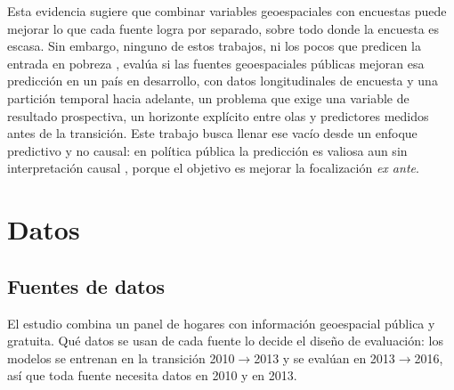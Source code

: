 \documentclass[12pt, letterpaper]{article}
\begin{document}
Esta evidencia sugiere que combinar variables geoespaciales con encuestas
puede mejorar lo que cada fuente logra por separado, sobre todo donde la
encuesta es escasa. Sin embargo, ninguno de estos trabajos, ni los pocos
que predicen la entrada en pobreza \parencite{burger2021,hohberg2018},
evalúa si las fuentes geoespaciales públicas mejoran esa predicción en un
país en desarrollo, con datos longitudinales de encuesta y una partición
temporal hacia adelante, un problema que exige una variable de resultado
prospectiva, un horizonte explícito entre olas y predictores medidos
antes de la transición. Este trabajo busca llenar ese vacío desde un
enfoque predictivo y no causal: en política pública la predicción es
valiosa aun sin interpretación causal \parencite{Kleinberg2015}, porque
el objetivo es mejorar la focalización \emph{ex ante}.

\section{Datos}
\label{sec:datos}

\subsection{Fuentes de datos}
\label{subsec:elco}
\label{subsec:geo}

El estudio combina un panel de hogares con información geoespacial
pública y gratuita. Qué datos se usan de cada fuente lo decide el diseño
de evaluación: los modelos se entrenan en la transición 2010$\to$2013 y
se evalúan en 2013$\to$2016, así que toda fuente necesita datos en 2010 y
en 2013.
\end{document}
